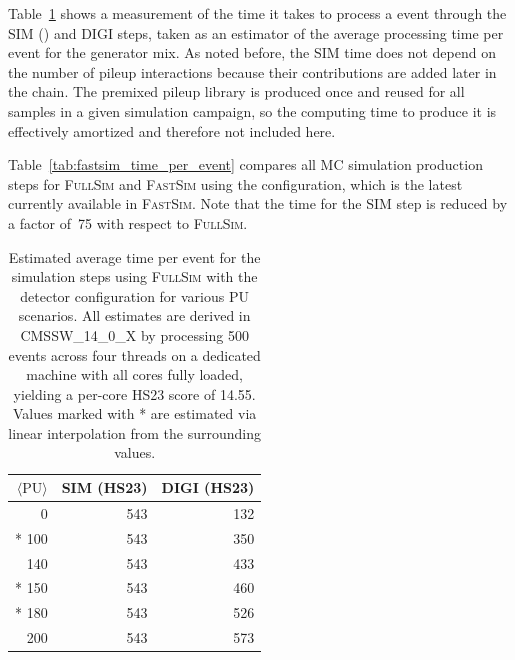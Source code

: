 Table~\ref{tab:fullsim_time_per_event} shows a measurement of the time it takes to process a \ttbar event through the \PhaseTwo \gls{SIM} (\GEANTfour) and \gls{DIGI} steps, taken as an estimator of the average processing time per event for the generator mix. As noted before, the \gls{SIM} time does not depend on the number of pileup interactions because their contributions are added later in the chain.
The premixed pileup library is produced once and reused for all samples in a given simulation campaign, so the computing time to produce it is effectively amortized and therefore not included here.

Table~\ref{tab:fastsim_time_per_event} compares all \gls{MC} simulation production steps for \textsc{FullSim} and \textsc{FastSim} using the \PhaseOne configuration, which is the latest currently available in \textsc{FastSim}. Note that the time for the \gls{SIM} step is reduced by a factor of~75 with respect to \textsc{FullSim}.

\begin{table}[tbhp]
    \centering
	\caption{Estimated average time per event for the simulation steps using \textsc{FullSim} with the \PhaseTwo detector configuration for various \gls{PU} scenarios.
	All estimates are derived in \gls{CMSSW}\_14\_0\_X by processing 500 events across four threads on a dedicated machine with all cores fully loaded, yielding a per-core HS23 score of 14.55. Values marked with * are estimated via linear interpolation from the surrounding values.}
    \begin{tabular}{|r|r|r|}
    \hline
    \rowcolor{tableheader} 
    $\langle \text{PU} \rangle$         & SIM (HS23) & DIGI (HS23) \\ \hline
    \cellcolor{tablerowheader} 0        & 543        & 132 \\
    \cellcolor{tablerowheader} * 100    & 543        & 350 \\
    \cellcolor{tablerowheader} 140      & 543        & 433 \\
    \cellcolor{tablerowheader} * 150    & 543        & 460 \\
    \cellcolor{tablerowheader} * 180    & 543        & 526 \\
    \cellcolor{tablerowheader} 200      & 543        & 573 \\
    \hline
    \end{tabular}
	\label{tab:fullsim_time_per_event}
\end{table}

